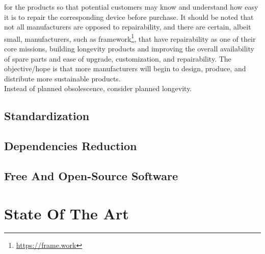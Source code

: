 for the products so that potential customers may know and understand how easy it
is to repair the corresponding device before purchase. It should be noted that
not all manufacturers are opposed to repairability, and there are certain,
albeit small, manufacturers, such as framework\footnote{\url{https://frame.work}},
that have repairability as one of their core missions, building longevity
products and improving the overall availability of spare parts and ease of
upgrade, customization, and repairability. The objective/hope is that more manufacturers
will begin to design, produce, and distribute more sustainable products. \\ %
Instead of planned obsolescence, consider planned longevity. \\ %

\subsection{Standardization}
\label{subsec:introduction_principles_standardization}





\subsection{Dependencies Reduction}
\label{subsec:introduction_principles_dependencies_reduction}

\subsection{Free And Open-Source Software}
\label{subsec:introduction_principles_reusability_free_and_open_source_software}

\section{State Of The Art}
\label{sec:introduction_state_of_the_art}


